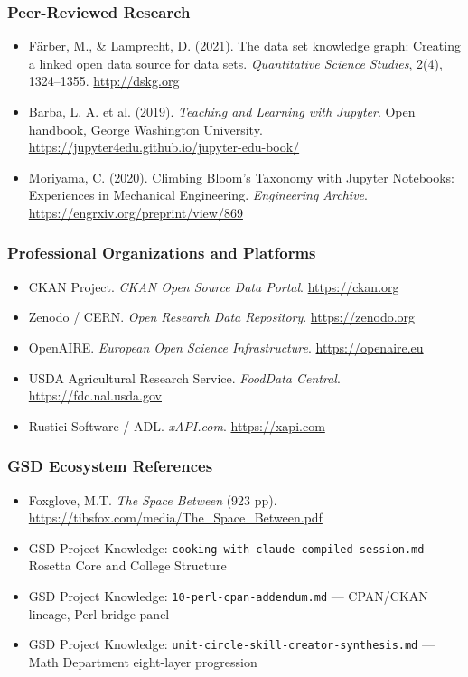 \documentclass[11pt,letterpaper]{article}
\begin{document}
\subsubsection{Peer-Reviewed Research}

\begin{itemize}
  \item Färber, M., \& Lamprecht, D. (2021). The data set knowledge graph: Creating a linked open data source for data sets. \textit{Quantitative Science Studies}, 2(4), 1324--1355. \url{http://dskg.org}
  \item Barba, L. A. et al. (2019). \textit{Teaching and Learning with Jupyter}. Open handbook, George Washington University. \url{https://jupyter4edu.github.io/jupyter-edu-book/}
  \item Moriyama, C. (2020). Climbing Bloom's Taxonomy with Jupyter Notebooks: Experiences in Mechanical Engineering. \textit{Engineering Archive}. \url{https://engrxiv.org/preprint/view/869}
\end{itemize}

\subsubsection{Professional Organizations and Platforms}

\begin{itemize}
  \item CKAN Project. \textit{CKAN Open Source Data Portal}. \url{https://ckan.org}
  \item Zenodo / CERN. \textit{Open Research Data Repository}. \url{https://zenodo.org}
  \item OpenAIRE. \textit{European Open Science Infrastructure}. \url{https://openaire.eu}
  \item USDA Agricultural Research Service. \textit{FoodData Central}. \url{https://fdc.nal.usda.gov}
  \item Rustici Software / ADL. \textit{xAPI.com}. \url{https://xapi.com}
\end{itemize}

\subsubsection{GSD Ecosystem References}

\begin{itemize}
  \item Foxglove, M.T. \textit{The Space Between} (923 pp). \url{https://tibsfox.com/media/The_Space_Between.pdf}
  \item GSD Project Knowledge: \texttt{cooking-with-claude-compiled-session.md} --- Rosetta Core and College Structure
  \item GSD Project Knowledge: \texttt{10-perl-cpan-addendum.md} --- CPAN/CKAN lineage, Perl bridge panel
  \item GSD Project Knowledge: \texttt{unit-circle-skill-creator-synthesis.md} --- Math Department eight-layer progression
\end{itemize}
\end{document}
